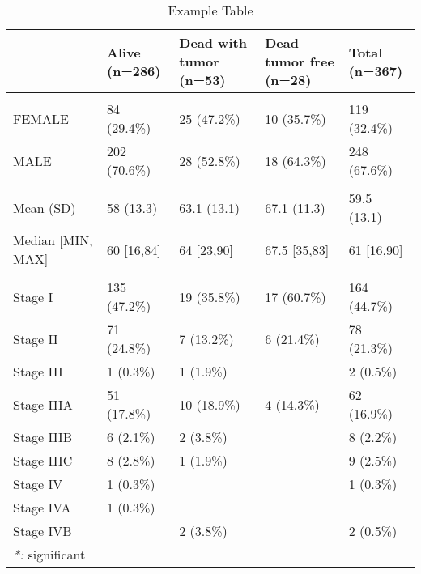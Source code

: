 \documentclass[]{article}
\begin{document}
\begin{table}

\caption{\label{tab:unnamed-chunk-1}Example Table}
\centering
\begin{tabular}[t]{lllll}
\toprule
  & \makecell[c]{Alive\\(n=286)} & \makecell[c]{Dead with tumor\\(n=53)} & \makecell[c]{Dead tumor free\\(n=28)} & \makecell[c]{Total\\(n=367)}\\
\midrule
\addlinespace[0.3em]
\multicolumn{5}{l}{\textbf{Gender*}}\\
\hspace{1em}FEMALE & 84 (29.4\%) & 25 (47.2\%) & 10 (35.7\%) & 119 (32.4\%)\\
\hspace{1em}MALE & 202 (70.6\%) & 28 (52.8\%) & 18 (64.3\%) & 248 (67.6\%)\\
\addlinespace[0.3em]
\multicolumn{5}{l}{\textbf{Age}}\\
\hspace{1em}Mean (SD) & 58 (13.3) & 63.1 (13.1) & 67.1 (11.3) & 59.5 (13.1)\\
\hspace{1em}Median [MIN, MAX] & 60 [16,84] & 64 [23,90] & 67.5 [35,83] & 61 [16,90]\\
\addlinespace[0.3em]
\multicolumn{5}{l}{\textbf{Stage}}\\
\hspace{1em}Stage I & 135 (47.2\%) & 19 (35.8\%) & 17 (60.7\%) & 164 (44.7\%)\\
\hspace{1em}Stage II & 71 (24.8\%) & 7 (13.2\%) & 6 (21.4\%) & 78 (21.3\%)\\
\hspace{1em}Stage III & 1 (0.3\%) & 1 (1.9\%) &  & 2 (0.5\%)\\
\hspace{1em}Stage IIIA & 51 (17.8\%) & 10 (18.9\%) & 4 (14.3\%) & 62 (16.9\%)\\
\hspace{1em}Stage IIIB & 6 (2.1\%) & 2 (3.8\%) &  & 8 (2.2\%)\\
\hspace{1em}Stage IIIC & 8 (2.8\%) & 1 (1.9\%) &  & 9 (2.5\%)\\
\hspace{1em}Stage IV & 1 (0.3\%) &  &  & 1 (0.3\%)\\
\hspace{1em}Stage IVA & 1 (0.3\%) &  &  & \\
\hspace{1em}Stage IVB &  & 2 (3.8\%) &  & 2 (0.5\%)\\
\bottomrule
\multicolumn{5}{l}{\textit{*: } significant}\\
\end{tabular}
\end{table}
\end{document}
